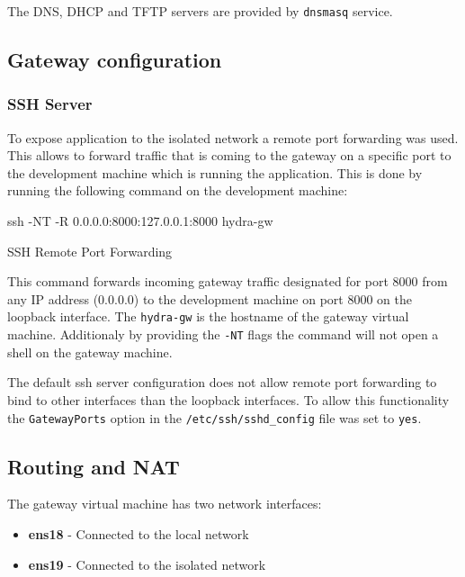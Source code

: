 \documentclass[../main.tex]{subfiles}
\begin{document}
The DNS, DHCP and TFTP servers are provided by \texttt{dnsmasq} \cite{dnsmasq} service.

\subsection{Gateway configuration}

\subsubsection{SSH Server}

To expose application to the isolated network a remote port forwarding was used. This allows to forward traffic that is coming to the gateway on a specific port to the development machine which
is running the application. This is done by running the following command on the development machine:

\begin{listing}[H]
  \begin{bashcode}
    ssh -NT -R 0.0.0.0:8000:127.0.0.1:8000 hydra-gw
  \end{bashcode}
  \caption{SSH Remote Port Forwarding}
  \label{lst:ssh-remote-port-forwarding}
\end{listing}

This command forwards incoming gateway traffic designated for port 8000 from any IP address (0.0.0.0) to the development machine on port 8000 on the loopback interface.
The \texttt{hydra-gw} is the hostname of the gateway virtual machine. Additionaly by providing the \texttt{-NT} flags the command will not open a shell on the gateway machine.

The default ssh server configuration does not allow remote port forwarding to bind to other interfaces than the loopback interfaces.
To allow this functionality the \texttt{GatewayPorts} option in the \texttt{/etc/ssh/sshd\_config} file was set to \texttt{yes}.

\subsection{Routing and NAT}

The gateway virtual machine has two network interfaces:

\begin{itemize}
  \item \textbf{ens18} - Connected to the local network
  \item \textbf{ens19} - Connected to the isolated network
\end{itemize}
\end{document}

